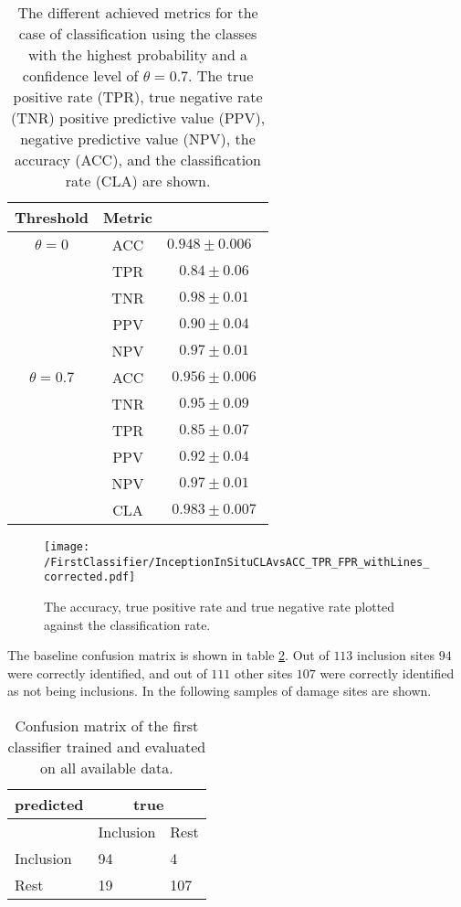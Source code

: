 \begin{table}[H]
 \begin{center}
  \begin{tabular}{@{} *3c @{}} \toprule[2pt]
   Threshold & Metric &   \\ \midrule
   $\theta=0$ & ACC & $0.948\pm0.006 \text{ }$ \\
   &TPR  & $0.84\pm 0.06$ \\
   &TNR  & $0.98\pm 0.01$ \\
   &PPV  & $0.90\pm0.04$ \\
   &NPV  & $0.97\pm0.01$ \\ \midrule
   $\theta=0.7$& ACC & $0.956 \pm 0.006$ \\
   &TNR  & $0.95\pm 0.09$ \\
   &TPR  & $0.85\pm 0.07$ \\
   &PPV  & $0.92\pm 0.04$ \\
   &NPV  & $0.97 \pm0.01$ \\ 
   &CLA  & $0.983\pm 0.007$ \\ \bottomrule[2pt]
  \end{tabular}
 \end{center}
 \caption{{The different achieved metrics for the case of classification using the classes with the highest probability and a confidence level of $\theta =0.7$. The true positive rate (TPR), true negative rate (TNR) positive predictive value (PPV), negative predictive value (NPV), the accuracy (ACC), and the classification rate (CLA) are shown.}}
   \label{tab:FirstClassifierMetrics}
\end{table}

\begin{figure}[H]
\texttt{[image: /FirstClassifier/InceptionInSituCLAvsACC\_TPR\_FPR\_withLines\_corrected.pdf]}
\caption{The accuracy, true positive rate and true negative rate plotted against the classification rate. }
\label{fig:FirstClassifierInSitu}
\end{figure}

The baseline confusion matrix is shown in table \ref{tab:FirstClassifierConfusionMatrixInSitu}. Out of $113$ inclusion sites $94$ were correctly identified, and out of $111$ other sites $107$ were correctly identified as not being inclusions. In the following samples of damage sites are shown.

\begin{table}[H]
 \begin{center}
  \begin{tabular}{@{} *3l @{}} \toprule[2pt]
   predicted &  \multicolumn{2}{c}{true}  \\\midrule
    & Inclusion  & Rest   \\ 
   Inclusion  & 94 & 4 \\ 
   Rest  & 19 & 107 \\ \bottomrule[2pt]
  \end{tabular}
 \end{center}
 \caption{Confusion matrix of the first classifier trained and evaluated on all available data.}
   \label{tab:FirstClassifierConfusionMatrixInSitu}
\end{table}

